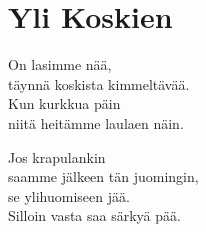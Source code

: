 \section{Yli Koskien}
On lasimme nää,\\
täynnä koskista kimmeltävää.\\
Kun kurkkua päin\\
niitä heitämme laulaen näin.

Jos krapulankin\\
saamme jälkeen tän juomingin,\\
se ylihuomiseen jää.\\
Silloin vasta saa särkyä pää.